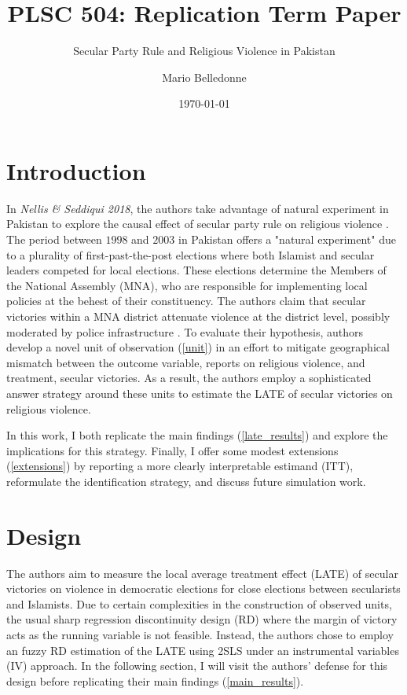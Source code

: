 \documentclass{scrartcl}
\title{PLSC 504: Replication Term Paper}
\subtitle{Secular Party Rule and Religious Violence in Pakistan}
\author{Mario Belledonne}
\date{\today}
\begin{document}
\maketitle

\section{Introduction}


In \textit{Nellis \& Seddiqui 2018}, the authors take advantage of natural experiment in Pakistan to explore the causal effect of secular party rule on religious violence \cite{nellis_siddiqui_2018}.
The period between $1998$ and $2003$ in Pakistan offers a "natural experiment" due to a plurality of first-past-the-post elections where both Islamist and secular leaders competed for local elections.
These elections determine the Members of the National Assembly (MNA), who are responsible for implementing local policies at the behest of their constituency.
The authors claim that secular victories within a MNA district attenuate violence at the district level, possibly moderated by police infrastructure \cite{nellis_siddiqui_2018}. 
To evaluate their hypothesis, authors develop a novel unit of observation (\ref{unit}) in an effort to mitigate geographical mismatch between the outcome variable, reports on religious violence, and treatment, secular victories. 
As a result, the authors employ a sophisticated answer strategy around these units to estimate the LATE of secular victories on religious violence.

In this work, I both replicate the main findings (\ref{late_results}) and explore the implications for this strategy. Finally, I offer some modest extensions (\ref{extensions}) by reporting a more clearly interpretable estimand (ITT), reformulate the identification strategy, and discuss future simulation work.

\section{Design} \label{design}


The authors aim to measure the local average treatment effect (LATE) of secular victories on violence in democratic elections for close elections between secularists and Islamists.
Due to certain complexities in the construction of observed units, the usual sharp regression discontinuity design (RD) where the margin of victory acts as the running variable is not feasible.
Instead, the authors chose to employ an fuzzy RD estimation of the LATE using 2SLS under an instrumental variables (IV) approach.
In the following section, I will visit the authors' defense for this design before replicating their main findings (\ref{main_results}).
\end{document}
